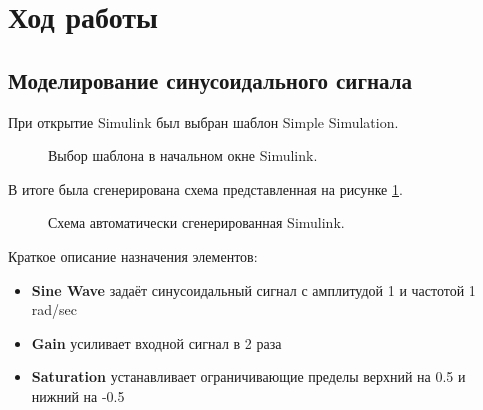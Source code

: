 \documentclass[a4paper,14pt]{extarticle}
\begin{document}
\section{Ход работы}

\subsection{Моделирование синусоидального сигнала}

При открытие Simulink был выбран шаблон Simple Simulation.

\begin{figure}[H]
\caption{Выбор шаблона в начальном окне Simulink.}
\end{figure}

\newpage

В итоге была сгенерирована схема представленная на рисунке \ref{001}.

\begin{figure}[H]
\caption{Схема автоматически сгенерированная Simulink.}
\label{001}
\end{figure}


Краткое описание назначения элементов:
\begin{itemize}
\item \textbf{Sine Wave} задаёт синусоидальный сигнал с амплитудой 1 и частотой 1 rad/sec
\item \textbf{Gain} усиливает входной сигнал в 2 раза
\item \textbf{Saturation} устанавливает ограничивающие пределы верхний на 0.5 и нижний на -0.5\\
\end{itemize}
\end{document}

